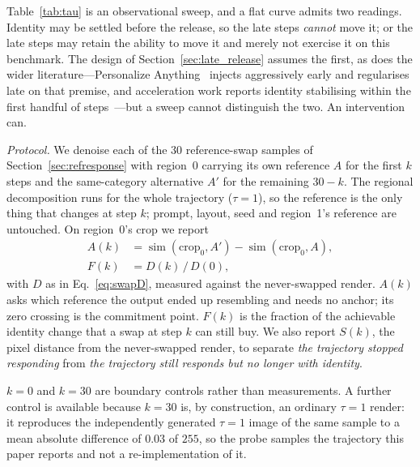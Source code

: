 \documentclass[10pt,twocolumn,letterpaper]{article}
\begin{document}
Table~\ref{tab:tau} is an observational sweep, and a flat curve admits two
readings.  Identity may be settled before the release, so the late steps
\emph{cannot} move it; or the late steps may retain the ability to move it and
merely not exercise it on this benchmark.  The design of
Section~\ref{sec:late_release} assumes the first, as does the wider
literature---Personalize Anything~\cite{feng2026personalize} injects
aggressively early and regularises late on that premise, and acceleration work
reports identity stabilising within the first handful of
steps~\cite{zheng2026fewsteps}---but a sweep cannot distinguish the two.  An
intervention can.

\noindent\textit{Protocol.}
We denoise each of the 30 reference-swap samples of
Section~\ref{sec:refresponse} with region~0 carrying its own reference $A$ for
the first $k$ steps and the same-category alternative $A'$ for the remaining
$30-k$.  The regional decomposition runs for the whole trajectory
($\tau{=}1$), so the reference is the only thing that changes at step $k$;
prompt, layout, seed and region~1's reference are untouched.  On region~0's
crop we report
\begin{align}
  A(k) &= \operatorname{sim}(\mathrm{crop}_0,A')
        - \operatorname{sim}(\mathrm{crop}_0,A), \label{eq:swapA}\\
  F(k) &= D(k)\,/\,D(0), \label{eq:swapF}
\end{align}
with $D$ as in Eq.~\ref{eq:swapD}, measured against the never-swapped render.
$A(k)$ asks which reference the output ended up resembling and needs no
anchor; its zero crossing is the commitment point.  $F(k)$ is the fraction of
the achievable identity change that a swap at step $k$ can still buy.  We also
report $S(k)$, the pixel distance from the never-swapped render, to separate
\emph{the trajectory stopped responding} from \emph{the trajectory still
responds but no longer with identity}.

$k{=}0$ and $k{=}30$ are boundary controls rather than measurements.  A
further control is available because $k{=}30$ is, by construction, an ordinary
$\tau{=}1$ render: it reproduces the independently generated $\tau{=}1$ image
of the same sample to a mean absolute difference of $0.03$ of $255$, so the
probe samples the trajectory this paper reports and not a re-implementation of
it.
\end{document}
